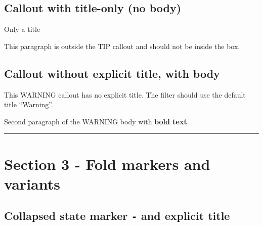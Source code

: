 \begin{tcolorbox}[breakable,colback=ocGryBack,colframe=ocGryFrame,coltitle=ocGryTitle,left=3mm,boxed title style={left=1mm},title={\hspace*{-2.5mm}\iconInfo\; md2pdf - inner without explicit \texttt{shift-heading=0}}]
\subsection*{Callout with title-only (no
body)}\label{inner-2-callout-with-title-only-no-body}

\vspace{2mm}

\noindent\begin{tcolorbox}[colback=ocYelBack,colframe=ocYelFrame,coltitle=ocYelTitle,left=3mm,width=\linewidth,boxrule=0pt]

\hspace*{-2.5mm}\iconHint\; Only a title

\end{tcolorbox}

This paragraph is outside the TIP callout and should not be inside the
box.

\subsection*{Callout without explicit title, with
body}\label{inner-2-callout-without-explicit-title-with-body}

\begin{tcolorbox}[breakable,colback=ocOrgBack,colframe=ocOrgFrame,coltitle=ocOrgTitle,left=3mm,boxed title style={left=1mm},title={\hspace*{-2.5mm}\iconWarning\; Warning}]

This WARNING callout has no explicit title. The filter should use the
default title ``Warning''.

Second paragraph of the WARNING body with \textbf{bold text}.

\end{tcolorbox}

\begin{center}\rule{0.5\linewidth}{0.5pt}\end{center}

\section*{Section 3 - Fold markers and
variants}\label{inner-2-section-3---fold-markers-and-variants}

\subsection*{\texorpdfstring{Collapsed state marker \texttt{-} and
explicit
title}{Collapsed state marker - and explicit title}}\label{inner-2-collapsed-state-marker---and-explicit-title}


\end{tcolorbox}
